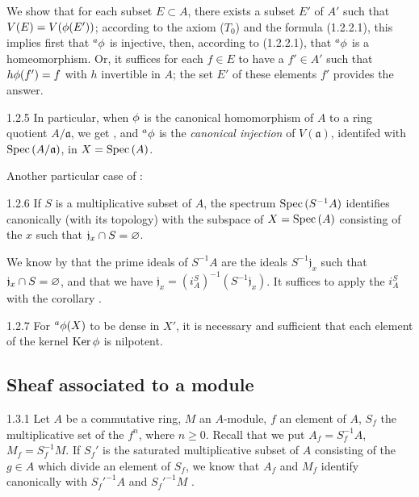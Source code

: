 We show that for each subset $E\subset A$, there exists a subset $E'$ of $A'$ such that
$V(E)=V(\phi(E'))$; according to the axiom ($T_0$)  and the formula
(1.2.2.1), this implies first that ${}^a\phi$ is injective, then, according to (1.2.2.1),
that ${}^a\phi$ is a homeomorphism. Or, it suffices for each $f\in E$ to have a $f'\in A'$
such that $h\phi(f')=f$ with $h$ invertible in $A$; the set $E'$ of these elements $f'$
provides the answer.

\begin{env}{1.2.5}
\label{env-1.1.2.5}
In particular, when $\phi$ is the canonical homomorphism of $A$ to a ring quotient
$A/\mathfrak{a}$, we get , and ${}^a\phi$ is the \emph{canonical
injection} of $V(\mathfrak{a})$, identifed with ${\mathop{\mathrm{Spec}}\nolimits}\,(A/\mathfrak{a})$, in $X={\mathop{\mathrm{Spec}}\nolimits}\,(A)$.
\end{env}

Another particular case of :
\begin{envs}[Corollary]{1.2.6}
\label{cor-1.1.2.6}
If $S$ is a multiplicative subset of $A$, the spectrum ${\mathop{\mathrm{Spec}}\nolimits}\,(S^{-1}A)$ identifies
canonically (with its topology) with the subspace of $X={\mathop{\mathrm{Spec}}\nolimits}\,(A)$ consisting of the $x$
such that $\mathfrak{j}_x\cap S=\varnothing$.
\end{envs}

We know by  that the prime ideals of $S^{-1}A$ are the ideals
$S^{-1}\mathfrak{j}_x$ such that $\mathfrak{j}_x\cap S=\varnothing$, and that we have
$\mathfrak{j}_x=(i_A^S)^{-1}(S^{-1}\mathfrak{j}_x)$. It suffices to apply the $i_A^S$
with the corollary .

\begin{envs}[Corollary]{1.2.7}
\label{cor-1.1.2.7}
For ${}^a\phi(X)$ to be dense in $X'$, it is necessary and sufficient that each element
of the kernel ${\mathop{\mathrm{Ker}}\nolimits}\,\phi$ is nilpotent.
\end{envs}

\subsection{Sheaf associated to a module}
\label{1-schemes-1.3}

\begin{env}{1.3.1}
\label{env-1.1.3.1}
Let $A$ be a commutative ring, $M$ an $A$-module, $f$ an element of $A$, $S_f$ the
multiplicative set of the $f^n$, where $n\geqslant 0$. Recall that we put $A_f=S_f^{-1}A$,
$M_f=S_f^{-1}M$. If $S_f'$ is the saturated multiplicative subset of $A$ consisting of the
$g\in A$ which divide an element of $S_f$, we know that $A_f$ and $M_f$ identify canonically
with ${S_f'}^{-1}A$ and ${S_f'}^{-1}M$ .
\end{env}

